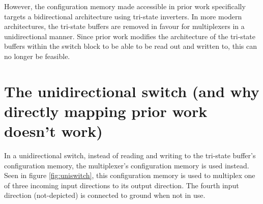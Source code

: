 However, the configuration memory made accessible in prior work specifically targets a bidirectional architecture using tri-state inverters. In more modern architectures, the tri-state buffers are removed in favour for multiplexers in a unidirectional manner. Since prior work modifies the architecture of the tri-state buffers within the switch block to be able to be read out and written to, this can no longer be feasible. 

\section{The unidirectional switch (and why directly mapping prior work doesn't work)}
In a unidirectional switch, instead of reading and writing to the tri-state buffer's configuration memory, the multiplexer's configuration memory is used instead. Seen in figure \ref{fig:uniswitch}, this configuration memory is used to multiplex one of three incoming input directions to its output direction. The fourth input direction (not-depicted) is connected to ground when not in use.

